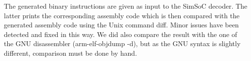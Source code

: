\documentclass[conference]{ieeeconf}
\begin{document}
The generated binary instructions are given as input to the SimSoC
decoder. The latter prints the corresponding assembly code which is then
compared with the generated assembly code using the Unix command {\stt
  diff}.  Minor issues have been detected and fixed in this way. We did also
compare the result with the one of the GNU disassembler ({\stt arm-elf-objdump
  -d}), but as the GNU syntax is slightly different, comparison must be done by
hand.








\end{document}
